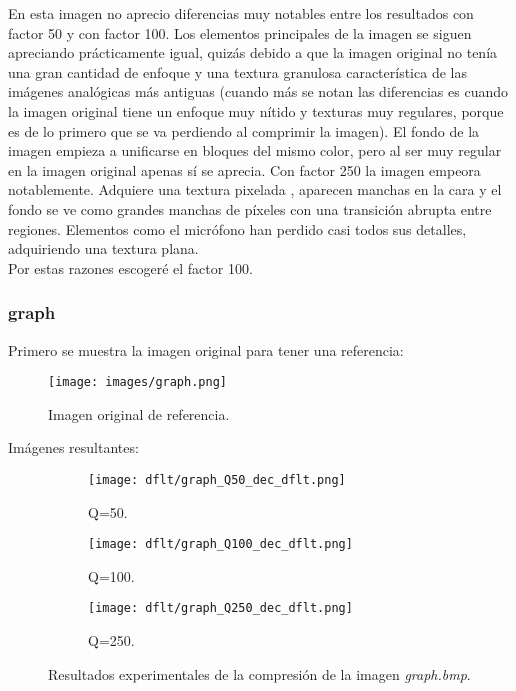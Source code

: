 \documentclass[12pt,a4paper]{article}
\begin{document}
En esta imagen no aprecio diferencias muy notables entre los resultados con factor 50 y con factor 100. Los elementos principales de la imagen se siguen apreciando prácticamente igual, quizás debido a que la imagen original no tenía una gran cantidad de enfoque y una textura granulosa característica de las imágenes analógicas más antiguas (cuando más se notan las diferencias es cuando la imagen original tiene un enfoque muy nítido y texturas muy regulares, porque es de lo primero que se va perdiendo al comprimir la imagen). El fondo de la imagen empieza a unificarse en bloques del mismo color, pero al ser muy regular en la imagen original apenas sí se aprecia. Con factor 250 la imagen empeora notablemente. Adquiere una textura pixelada , aparecen manchas en la cara y el fondo se ve como grandes manchas de píxeles con una transición abrupta entre regiones. Elementos como el micrófono han perdido casi todos sus detalles, adquiriendo una textura plana.\\

Por estas razones escogeré el factor 100.




\subsubsection{graph}
Primero se muestra la imagen original para tener una referencia:
\begin{figure}[H]
    \centering
    \texttt{[image: images/graph.png]}
    \caption[Referencia - graph]{Imagen original de referencia.}
    
\end{figure}
    \vspace{0.5cm}
    
Imágenes resultantes:
\begin{figure}   [H]
    \begin{subfigure}{0.30\textwidth}
        \centering
        \texttt{[image: dflt/graph\_Q50\_dec\_dflt.png]}
        \caption{Q=50.}
        
    \end{subfigure}
    \hfill
    \begin{subfigure}{0.30\textwidth}
        \centering
        \texttt{[image: dflt/graph\_Q100\_dec\_dflt.png]}
        \caption{Q=100.}
        
    \end{subfigure}
    \hfill
    \begin{subfigure}{0.30\textwidth}
        \centering
        \texttt{[image: dflt/graph\_Q250\_dec\_dflt.png]}
        \caption{Q=250.}
        
    \end{subfigure}
    
    \vspace{0.5cm}
    
    \caption[Resultados experimentales - graph]{Resultados experimentales de la compresión de la imagen \textit{graph.bmp}.}
    
\end{figure}
\end{document}
